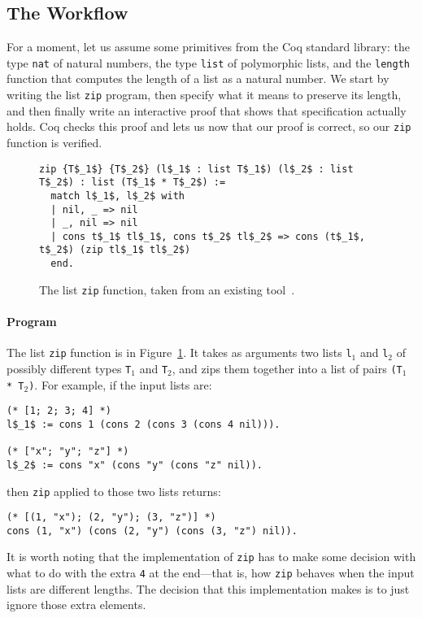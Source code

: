 \subsection{The Workflow}
\label{sec:mot-workflow}

For a moment, let us assume some primitives from the Coq standard library: the type \lstinline{nat} of natural numbers,
the type \lstinline{list} of polymorphic lists, and the \lstinline{length} function that computes the length of a list as a natural number.
We start by writing the list \lstinline{zip} program, then specify what it means to preserve its length, and then finally
write an interactive proof that shows that specification actually holds.
Coq checks this proof and lets us now that our proof is correct, so our \lstinline{zip} function is verified.

\begin{figure}
\begin{lstlisting}
zip {T$_1$} {T$_2$} (l$_1$ : list T$_1$) (l$_2$ : list T$_2$) : list (T$_1$ * T$_2$) :=
  match l$_1$, l$_2$ with
  | nil, _ => nil
  | _, nil => nil
  | cons t$_1$ tl$_1$, cons t$_2$ tl$_2$ => cons (t$_1$, t$_2$) (zip tl$_1$ tl$_2$)
  end.
\end{lstlisting}
\caption{The list \lstinline{zip} function, taken from an existing tool~\cite{TODO}.} %
\label{fig:zip}
\end{figure}

\paragraph{Program} The list \lstinline{zip} function is in Figure~\ref{fig:zip}.
It takes as arguments two lists \lstinline{l}$_1$ and \lstinline{l}$_2$ of possibly different types \lstinline{T}$_1$ and \lstinline{T}$_2$, and zips them together into
a list of pairs \lstinline{(T}$_1$\lstinline{ * T}$_2$\lstinline{)}.
For example, if the input lists are: %

\begin{lstlisting}
(* [1; 2; 3; 4] *)
l$_1$ := cons 1 (cons 2 (cons 3 (cons 4 nil))).

(* ["x"; "y"; "z"] *)
l$_2$ := cons "x" (cons "y" (cons "z" nil)).
\end{lstlisting}
then \lstinline{zip} applied to those two lists returns:

\begin{lstlisting}
(* [(1, "x"); (2, "y"); (3, "z")] *)
cons (1, "x") (cons (2, "y") (cons (3, "z") nil)).
\end{lstlisting}
It is worth noting that the implementation of \lstinline{zip} has to make some decision with
what to do with the extra \lstinline{4} at the end---that is, how \lstinline{zip} behaves when the input
lists are different lengths.
The decision that this implementation makes is to just ignore those extra elements.

